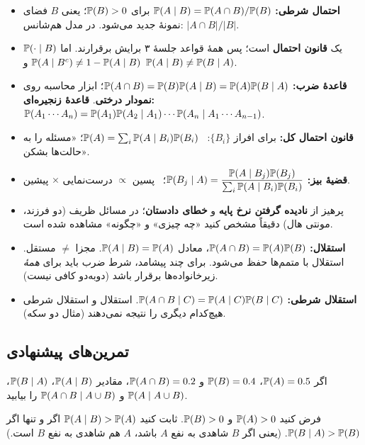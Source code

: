 \begin{summary}
\begin{itemize}
  \item \textbf{احتمال شرطی:} $\P(A\mid B)=\P(A\cap B)/\P(B)$ برای $\P(B)>0$؛ یعنی $B$ فضای نمونهٔ جدید می‌شود. در مدل هم‌شانس: $|A\cap B|/|B|$.
  \item $\P(\cdot\mid B)$ یک \textbf{قانون احتمال} است؛ پس همهٔ قواعد جلسهٔ ۳ برایش برقرارند. اما $\P(A\mid B^c)\ne1-\P(A\mid B)$ و $\P(A\mid B)\ne\P(B\mid A)$.
  \item \textbf{قاعدهٔ ضرب:} $\P(A\cap B)=\P(B)\P(A\mid B)=\P(A)\P(B\mid A)$؛ ابزار محاسبه روی \textbf{نمودار درختی}. \textbf{قاعدهٔ زنجیره‌ای:} $\P(A_1\cdots A_n)=\P(A_1)\P(A_2\mid A_1)\cdots\P(A_n\mid A_1\cdots A_{n-1})$.
  \item \textbf{قانون احتمال کل:} برای افراز $\{B_i\}$: \ $\P(A)=\sum_i\P(A\mid B_i)\P(B_i)$؛ «مسئله را به حالت‌ها بشکن».
  \item \textbf{قضیهٔ بیز:} $\P(B_j\mid A)=\dfrac{\P(A\mid B_j)\P(B_j)}{\sum_i\P(A\mid B_i)\P(B_i)}$؛ \ پسین $\propto$ درست‌نمایی $\times$ پیشین.
  \item پرهیز از \textbf{نادیده گرفتن نرخ پایه} و \textbf{خطای دادستان}؛ در مسائل ظریف (دو فرزند، مونتی هال) دقیقاً مشخص کنید «چه چیزی» و «چگونه» مشاهده شده است.
  \item \textbf{استقلال:} $\P(A\cap B)=\P(A)\P(B)$، معادل $\P(A\mid B)=\P(A)$. مجزا $\ne$ مستقل. استقلال با متمم‌ها حفظ می‌شود. برای چند پیشامد، شرط ضرب باید برای \emph{همهٔ} زیرخانواده‌ها برقرار باشد (دوبه‌دو کافی نیست).
  \item \textbf{استقلال شرطی:} $\P(A\cap B\mid C)=\P(A\mid C)\P(B\mid C)$. استقلال و استقلال شرطی هیچ‌کدام دیگری را نتیجه نمی‌دهند (مثال دو سکه).
\end{itemize}
\end{summary}


\subsection*{تمرین‌های پیشنهادی}

\begin{exercise}
اگر $\P(A)=0.5$، $\P(B)=0.4$ و $\P(A\cap B)=0.2$، مقادیر $\P(A\mid B)$، $\P(B\mid A)$، $\P(A\mid A\cup B)$ و $\P(A\cap B\mid A\cup B)$ را بیابید.
\end{exercise}

\begin{exercise}
فرض کنید $\P(A)>0$ و $\P(B)>0$. ثابت کنید $\P(A\mid B)>\P(A)$ اگر و تنها اگر $\P(B\mid A)>\P(B)$. (یعنی اگر $B$ شاهدی به نفع $A$ باشد، $A$ هم شاهدی به نفع $B$ است.)
\end{exercise}

